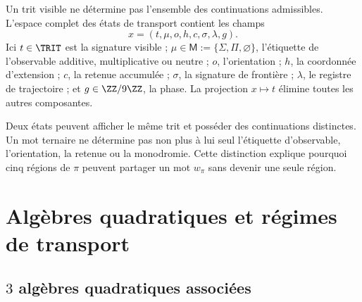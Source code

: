 Un trit visible ne détermine pas l'ensemble des continuations admissibles.
L'espace complet des états de transport contient les champs
\[
x=(t,\mu,o,h,c,\sigma,\lambda,g).
\]
Ici \(t\in\TRIT\) est la signature visible ;
\(\mu\in\mathsf M:=\{\Sigma,\Pi,\varnothing\}\), l'étiquette de l'observable
additive, multiplicative ou neutre ; \(o\), l'orientation ; \(h\), la coordonnée d'extension ;
\(c\), la retenue accumulée ; \(\sigma\), la signature de frontière ; \(\lambda\), le
registre de trajectoire ; et
\(g\in\ZZ/9\ZZ\), la phase. La projection \(x\mapsto t\) élimine toutes les
autres composantes.

\begin{remark}
Deux états peuvent afficher le même trit et posséder des continuations distinctes.
Un mot ternaire ne détermine pas non plus à lui seul l'étiquette d'observable,
l'orientation, la retenue ou la
monodromie. Cette distinction explique pourquoi cinq régions de \(\pi\) peuvent
partager un mot \(w_\pi\) sans devenir une seule région.
\end{remark}

\fi

\ifdefined\HMTTRITDevelopments
\chapter{Algèbres quadratiques et régimes de transport}
\label{chap:trit-algebras}

\section{\(3\) algèbres quadratiques associées}

